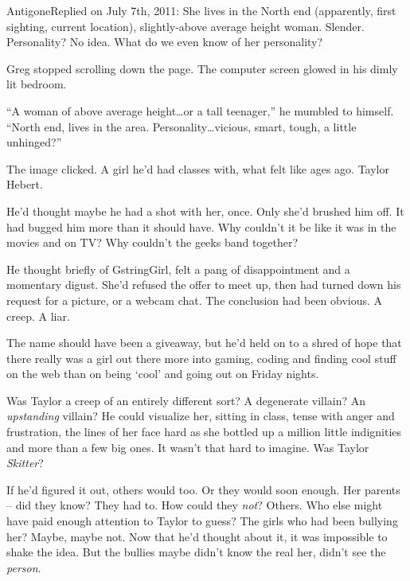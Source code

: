 \blacktriangleright AntigoneReplied on July 7th, 2011:
She lives in the North end (apparently, first sighting, current location), slightly-above average height woman.  Slender.  Personality?  No idea.  What do we even know of her personality?



\blacksquare



Greg stopped scrolling down the page.  The computer screen glowed in his dimly lit bedroom.



``A woman of above average height\ldots or a tall teenager,'' he mumbled to himself.  ``North end, lives in the area.  Personality\ldots vicious, smart, tough, a little unhinged?''



The image clicked.  A girl he'd had classes with, what felt like ages ago.  Taylor Hebert.



He'd thought maybe he had a shot with her, once.  Only she'd brushed him off.  It had bugged him more than it should have.  Why couldn't it be like it was in the movies and on TV?  Why couldn't the geeks band together?



He thought briefly of GstringGirl, felt a pang of disappointment and a momentary digust.  She'd refused the offer to meet up, then had turned down his request for a picture, or a webcam chat.  The conclusion had been obvious.  A creep.  A liar.



The name should have been a giveaway, but he'd held on to a shred of hope that there really was a girl out there more into gaming, coding and finding cool stuff on the web than on being `cool' and going out on Friday nights.



Was Taylor a creep of an entirely different sort?  A degenerate villain?  An \emph{upstanding} villain?  He could visualize her, sitting in class, tense with anger and frustration, the lines of her face hard as she bottled up a million little indignities and more than a few big ones.  It wasn't that hard to imagine.  Was Taylor \emph{Skitter}?



If he'd figured it out, others would too.  Or they would soon enough.  Her parents – did they know?  They had to.  How could they \emph{not}?  Others.  Who else might have paid enough attention to Taylor to guess?  The girls who had been bullying her?  Maybe, maybe not.  Now that he'd thought about it, it was impossible to shake the idea.  But the bullies maybe didn't know the real her, didn't see the \emph{person}.



